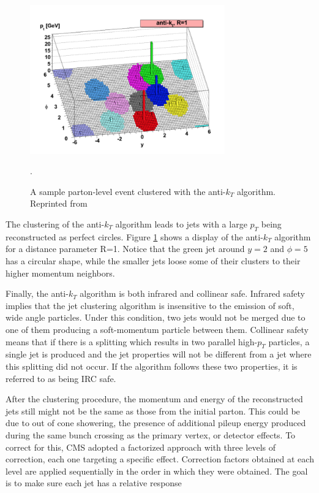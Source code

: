 \begin{figure}[h]
 	\centering
 	\includegraphics[width=0.75\textwidth]{figures/antikt.png}
 	\singlespace
 	\caption{A sample parton-level event clustered with the anti-$k_{T}$ algorithm. Reprinted from \cite{Cacciari:2008gp}}.
  	\label{fig:antikt} 	
\end{figure}

The clustering of the anti-$k_{T}$ algorithm leads to jets with a large $p_{T}$ being reconstructed as perfect circles. Figure \ref{fig:antikt} shows a display of the anti-$k_{T}$ algorithm for a distance parameter R=1. Notice that the green jet around $y=2$ and $\phi=5$ has a circular shape, while the smaller jets loose some of their clusters to their higher momentum neighbors.

Finally, the anti-$k_{T}$ algorithm is both infrared and collinear safe. Infrared safety implies that the jet clustering algorithm is insensitive to the emission of soft, wide angle particles. Under this condition, two jets would not be merged due to one of them producing a soft-momentum particle between them. Collinear safety means that if there is a splitting which results in two parallel high-$p_{T}$ particles, a single jet is produced and the jet properties will not be different from a jet where this splitting did not occur. If the algorithm follows these two properties, it is referred to as being IRC safe.


After the clustering procedure, the momentum and energy of the reconstructed jets still might not be the same as those from the initial parton. This could be due to out of cone showering, the presence of additional pileup energy produced during the same bunch crossing as the primary vertex, or detector effects. To correct for this, CMS adopted a factorized approach\cite{JINST2011} with three levels of correction, each one targeting a specific effect. Correction factors obtained at each level are applied sequentially in the order in which they were obtained. The goal is to make sure each jet has a relative response


